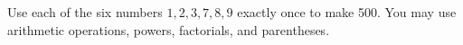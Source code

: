 Use each of the six numbers $1,2,3,7,8,9$ exactly once to make 500. You may use arithmetic operations, powers, factorials, and parentheses.

